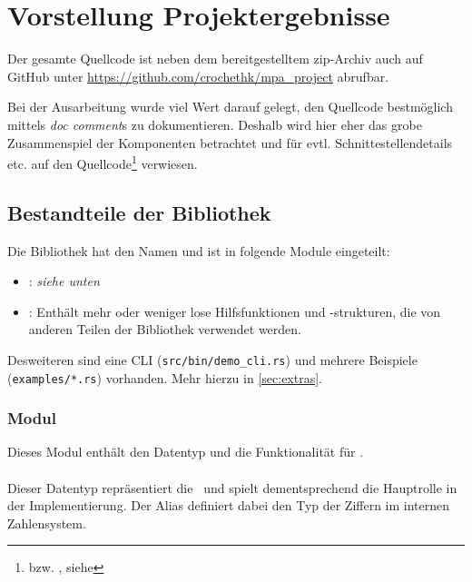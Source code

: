 \section{Vorstellung Projektergebnisse}\label{sec:projektergebnisse}
    Der gesamte Quellcode ist neben dem bereitgestelltem zip-Archiv auch auf GitHub unter \url{https://github.com/crochethk/mpa_project} abrufbar.

    Bei der Ausarbeitung wurde viel Wert darauf gelegt, den Quellcode bestmöglich mittels \emph{doc comment}s zu dokumentieren. Deshalb wird hier eher das grobe Zusammenspiel der Komponenten betrachtet und für evtl. Schnittestellendetails etc. auf den Quellcode\footnote{bzw. , siehe } verwiesen.

    \subsection{Bestandteile der Bibliothek}
        Die Bibliothek hat den Namen  und ist in folgende Module eingeteilt:

        \begin{itemize}
            \tightlist
            \item
            : \textit{siehe unten}
            \item
            : Enthält mehr oder weniger lose Hilfsfunktionen und -strukturen, die von anderen Teilen der Bibliothek verwendet werden.
        \end{itemize}

        Desweiteren sind eine CLI (\texttt{src/bin/demo\_cli.rs}) und mehrere Beispiele (\texttt{examples/*.rs}) vorhanden. Mehr hierzu in \autoref{sec:extras}.

    \subsubsection*{Modul }
        Dieses Modul enthält den Datentyp und die Funktionalität für \mpi.

        \paragraph{}
            Dieser Datentyp repräsentiert die \mpi\ und spielt dementsprechend die Hauptrolle in der Implementierung. Der Alias  definiert dabei den Typ der Ziffern im internen Zahlensystem.

